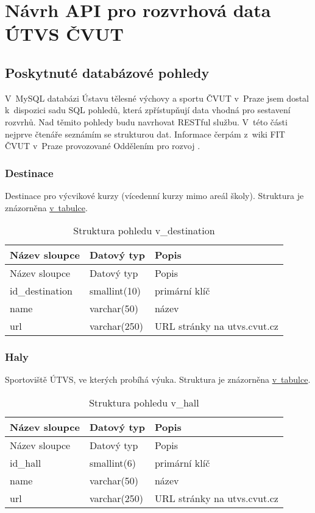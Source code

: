 \chapter{Návrh API pro rozvrhová data ÚTVS ČVUT \label{navrh}}

\section{Poskytnuté databázové pohledy}\label{poskytnutuxe9-databuxe1zovuxe9-pohledy}

V~MySQL databázi Ústavu tělesné výchovy a sportu ČVUT v~Praze jsem dostal k~dispozici sadu SQL pohledů, která zpřístupňují data vhodná pro sestavení rozvrhů. Nad těmito pohledy budu navrhovat RESTful službu. V~této části nejprve čtenáře seznámím se strukturou dat. Informace čerpám z~wiki FIT ČVUT v~Praze provozované Oddělením pro rozvoj \autocite{rozvojwiki}.

\subsection{Destinace}\label{destinace}

Destinace pro výcvikové kurzy (vícedenní kurzy mimo areál školy). Struktura je znázorněna \protect\hyperlink{tab:destination}{v~tabulce}.

\begin{longtable}[]{@{}lll@{}}
\caption{Struktura pohledu v\_destination \label{tab:destination}}\tabularnewline
\toprule
Název sloupce & Datový typ & Popis\tabularnewline
\midrule
\endfirsthead
\toprule
Název sloupce & Datový typ & Popis\tabularnewline
\midrule
\endhead
id\_destination & smallint(10) & primární klíč\tabularnewline
name & varchar(50) & název\tabularnewline
url & varchar(250) & URL stránky na utvs.cvut.cz\tabularnewline
\bottomrule
\end{longtable}

\subsection{Haly}\label{haly}

Sportoviště ÚTVS, ve kterých probíhá výuka. Struktura je znázorněna \protect\hyperlink{tab:hall}{v~tabulce}.

\begin{longtable}[]{@{}lll@{}}
\caption{Struktura pohledu v\_hall \label{tab:hall}}\tabularnewline
\toprule
Název sloupce & Datový typ & Popis\tabularnewline
\midrule
\endfirsthead
\toprule
Název sloupce & Datový typ & Popis\tabularnewline
\midrule
\endhead
id\_hall & smallint(6) & primární klíč\tabularnewline
name & varchar(50) & název\tabularnewline
url & varchar(250) & URL stránky na utvs.cvut.cz\tabularnewline
\bottomrule
\end{longtable}

